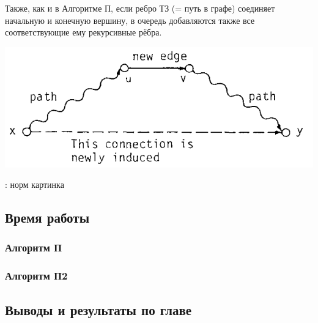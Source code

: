     Также, как и в Алгоритме П, если ребро ТЗ (= путь в графе) соединяет начальную и конечную вершину, в очередь добавляются также все соответствующие ему рекурсивные рёбра.

    \includegraphics[width=1\linewidth]{img/TC_add.png}

    \TODO: норм картинка

    
\subsection{Время работы}

\subsubsection{Алгоритм П}

\subsubsection{Алгоритм П2}

\subsection{Выводы и результаты по главе}
